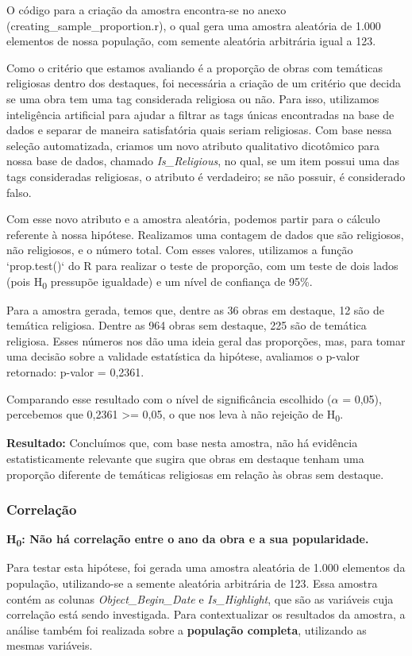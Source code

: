 \documentclass[11pt,a4paper]{article}
\begin{document}
O código para a criação da amostra encontra-se no anexo (creating\_sample\_proportion.r), o qual gera uma amostra aleatória de 1.000 elementos de nossa população, com semente aleatória arbitrária igual a 123.

Como o critério que estamos avaliando é a proporção de obras com temáticas religiosas dentro dos destaques, foi necessária a criação de um critério que decida se uma obra tem uma tag considerada religiosa ou não. Para isso, utilizamos inteligência artificial para ajudar a filtrar as tags únicas encontradas na base de dados e separar de maneira satisfatória quais seriam religiosas. Com base nessa seleção automatizada, criamos um novo atributo qualitativo dicotômico para nossa base de dados, chamado \textit{Is\_Religious}, no qual, se um item possui uma das tags consideradas religiosas, o atributo é verdadeiro; se não possuir, é considerado falso.

Com esse novo atributo e a amostra aleatória, podemos partir para o cálculo referente à nossa hipótese. Realizamos uma contagem de dados que são religiosos, não religiosos, e o número total. Com esses valores, utilizamos a função `prop.test()` do R para realizar o teste de proporção, com um teste de dois lados (pois H\textsubscript{0} pressupõe igualdade) e um nível de confiança de 95\%.

Para a amostra gerada, temos que, dentre as 36 obras em destaque, 12 são de temática religiosa. Dentre as 964 obras sem destaque, 225 são de temática religiosa. Esses números nos dão uma ideia geral das proporções, mas, para tomar uma decisão sobre a validade estatística da hipótese, avaliamos o p-valor retornado:
p-valor = 0,2361.

Comparando esse resultado com o nível de significância escolhido ($\alpha$ = 0,05), percebemos que 0,2361 >= 0,05, o que nos leva à não rejeição de H\textsubscript{0}.

\textbf{Resultado:} Concluímos que, com base nesta amostra, não há evidência estatisticamente relevante que sugira que obras em destaque tenham uma proporção diferente de temáticas religiosas em relação às obras sem destaque.

\subsubsection{Correlação}
\textbf{H\textsubscript{0}: Não há correlação entre o ano da obra e a sua popularidade.}

Para testar esta hipótese, foi gerada uma amostra aleatória de 1.000 elementos da população, utilizando-se a semente aleatória arbitrária de 123. Essa amostra contém as colunas \textit{Object\_Begin\_Date} e \textit{Is\_Highlight}, que são as variáveis cuja correlação está sendo investigada. Para contextualizar os resultados da amostra, a análise também foi realizada sobre a \textbf{população completa}, utilizando as mesmas variáveis.
\end{document}
